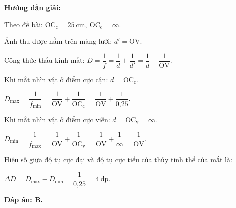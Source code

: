 {\begin{center}
	\textbf{Hướng dẫn giải:}
\end{center}

 Theo đề bài: $\text{OC}_\text{c}=25\ \text{cm}, \ \text{OC}_\text{c}=\infty$.
	
	Ảnh thu được nằm trên màng lưới: $d'=\text{OV}$.
	
	Công thức thấu kính mắt: $D=\dfrac{1}{f}=\dfrac{1}{d}+\dfrac{1}{d'}=\dfrac{1}{d}+\dfrac{1}{\text{OV}}$.
	
	Khi mắt nhìn vật ở điểm cực cận: $d=\text{OC}_\text{c}$.
	
		$D_\text{max}=\dfrac{1}{f_\text{min}}=\dfrac{1}{\text{OV}}+\dfrac{1}{\text{OC}_\text{c}}=\dfrac{1}{\text{OV}}+\dfrac{1}{\text{0,25}}$.
		
		Khi mắt nhìn vật ở điểm cực viễn: $d=\text{OC}_\text{v}=\infty$.
		
			$D_\text{min}=\dfrac{1}{f_\text{max}}=\dfrac{1}{\text{OV}}+\dfrac{1}{\text{OC}_\text{v}}=\dfrac{1}{\text{OV}}+\dfrac{1}{\infty}=\dfrac{1}{\text{OV}}$.
			
		Hiệu số giữa độ tụ cực đại và độ tụ cực tiểu của thủy tinh thể của mắt là:
		
		 $\Delta D= D_{\text{max}}-D_{\text{min}}=\dfrac{1}{\text{0,25}}=4\ \text{dp}$.
		 
\textbf{	Đáp án: B.}
}

